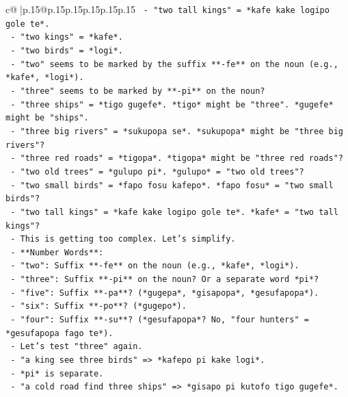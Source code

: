 \documentclass{article}
\begin{document}
{\begin{supertabular}{c@{$\;$}|p{.15\linewidth}@{}p{.15\linewidth}p{.15\linewidth}p{.15\linewidth}p{.15\linewidth}p{.15\linewidth}}
{{{\texttt{          {-} "two tall kings" = *kafe kake logipo gole te*.} \\
\texttt{          {-} "two kings" = *kafe*.} \\
\texttt{          {-} "two birds" = *logi*.} \\
\texttt{          {-} "two" seems to be marked by the suffix **{-}fe** on the noun (e.g., *kafe*, *logi*).} \\
\texttt{          {-} "three" seems to be marked by **{-}pi** on the noun?} \\
\texttt{          {-} "three ships" = *tigo gugefe*. *tigo* might be "three". *gugefe* might be "ships".} \\
\texttt{          {-} "three big rivers" = *sukupopa se*. *sukupopa* might be "three big rivers"?} \\
\texttt{          {-} "three red roads" = *tigopa*. *tigopa* might be "three red roads"?} \\
\texttt{          {-} "two old trees" = *gulupo pi*. *gulupo* = "two old trees"?} \\
\texttt{          {-} "two small birds" = *fapo fosu kafepo*. *fapo fosu* = "two small birds"?} \\
\texttt{          {-} "two tall kings" = *kafe kake logipo gole te*. *kafe* = "two tall kings"?} \\
\texttt{          {-} This is getting too complex. Let's simplify.} \\
\texttt{          {-} **Number Words**:} \\
\texttt{            {-} "two": Suffix **{-}fe** on the noun (e.g., *kafe*, *logi*).} \\
\texttt{            {-} "three": Suffix **{-}pi** on the noun? Or a separate word *pi*?} \\
\texttt{            {-} "five": Suffix **{-}pa**? (*gugepa*, *gisapopa*, *gesufapopa*).} \\
\texttt{            {-} "six": Suffix **{-}po**? (*gugepo*).} \\
\texttt{            {-} "four": Suffix **{-}su**? (*gesufapopa*? No, "four hunters" = *gesufapopa fago te*).} \\
\texttt{          {-} Let's test "three" again.} \\
\texttt{          {-} "a king see three birds" => *kafepo pi kake logi*.} \\
\texttt{          {-} *pi* is separate.} \\
\texttt{          {-} "a cold road find three ships" => *gisapo pi kutofo tigo gugefe*.} \\
}}}
\end{supertabular}}
\end{document}
